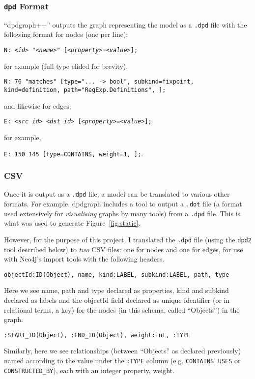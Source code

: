 \subsubsection{\texttt{dpd} Format}

``dpdgraph++'' outputs the graph representing the model as a \texttt{.dpd} file
with the following format for nodes (one per line):

{\tt N: \emph{<id>} "\emph{<name>}" [\emph{<property>}=\emph{<value>}];}

for example (full type elided for brevity), 

{\tt N: 76 "matches" [type="... -> bool", subkind=fixpoint, kind=definition, path="RegExp.Definitions", ];}

and likewise for edges:

{\tt E: \emph{<src id>} \emph{<dst id>} [\emph{<property>}=\emph{<value>}];}

for example, 

{\tt E: 150 145 [type=CONTAINS, weight=1, ];}.

\subsubsection{CSV}\label{subsubsec:translationcsv}

Once it is output as a \texttt{.dpd} file, a model can be translated to various
other formats. For example, dpdgraph includes a tool to output a \texttt{.dot}
file (a format used extensively for \emph{visualising} graphs by many tools)
from a \texttt{.dpd} file. This is what was used to generate
Figure~\ref{fig:static}.

However, for the purpose of this project, I translated the \texttt{.dpd} file
(using the \texttt{dpd2} tool described below) to \emph{two} CSV files: one for
nodes and one for edges, for use with Neo4j's import tools with the following
headers.

\texttt{objectId:ID(Object), name, kind:LABEL, subkind:LABEL, path, type}

Here we see name, path and type declared as properties, kind and subkind
declared as labels and the objectId field declared as unique identifier (or in
relational terms, a key) for the nodes (in this schema, called ``Objects'') in
the graph.

\texttt{:START\_ID(Object), :END\_ID(Object), weight:int, :TYPE}

Similarly, here we see relationships (between ``Objects'' as declared
previously) named according to the value under the \texttt{:TYPE} column (e.g.
\texttt{CONTAINS}, \texttt{USES} or \texttt{CONSTRUCTED\_BY}), each with an
integer property, weight.

